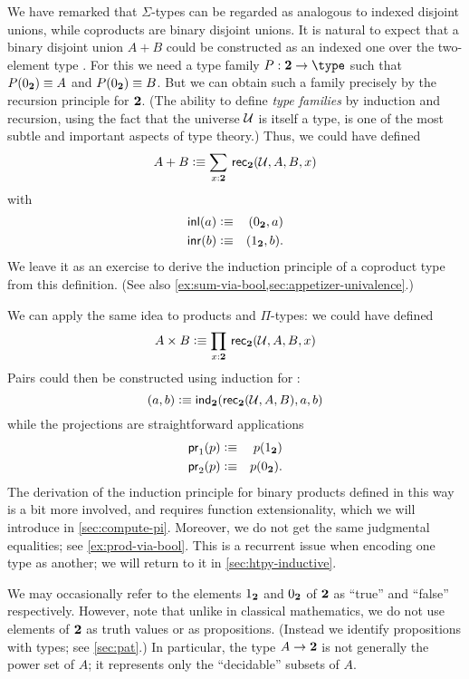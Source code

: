 We have remarked that $\Sigma$-types can be regarded as analogous to indexed disjoint unions, while coproducts are binary disjoint unions.
It is natural to expect that a binary disjoint union $A+B$ could be constructed as an indexed one over the two-element type \bool.
For this we need a type family $P:\bool\to\type$ such that $P({0_{\mathbf{2}}})\equiv A$ and $P({0_{\mathbf{2}}})\equiv B$.
But we can obtain such a family precisely by the recursion principle for $\mathbf{2}$.
(The ability to define \emph{type families} by induction and recursion, using the fact that the universe $\mathcal{U}$ is itself a type, is one of the most subtle and important aspects of type theory.)
Thus, we could have defined
\[ A + B \defeq \sm{x:\bool} \rec{\bool}(\UU,A,B,x) \]
with
\begin{eqnarray*}
  {\mathsf{inl}}(a) & \vcentcolon\equiv & ({0_{\mathbf{2}}},a) \\
  {\mathsf{inr}}(b) & \vcentcolon\equiv & ({1_{\mathbf{2}}},b).
\end{eqnarray*}
We leave it as an exercise to derive the induction principle of a coproduct type from this definition.
(See also \autoref{ex:sum-via-bool,sec:appetizer-univalence}.)

We can apply the same idea to products and $\Pi$-types: we could have defined
\[ A \times B \defeq \prd{x:\bool}\rec{\bool}(\UU,A,B,x) \]
Pairs could then be constructed using induction for \bool:
\[ (a,b) \vcentcolon\equiv \mathsf{ind}_{\mathbf{2}}(\mathsf{rec}_{\mathbf{2}}(\mathcal{U},A,B),a,b) \]
while the projections are straightforward applications
\begin{eqnarray*}
  \mathsf{pr}_{1}(p) & \vcentcolon\equiv & p({1_{\mathbf{2}}}) \\
  \mathsf{pr}_{2}(p) & \vcentcolon\equiv & p({0_{\mathbf{2}}}).
\end{eqnarray*}
The derivation of the induction principle for binary products defined in this way is a bit more involved, and requires function extensionality, which we will introduce in \autoref{sec:compute-pi}.
Moreover, we do not get the same judgmental equalities; see \autoref{ex:prod-via-bool}.
This is a recurrent issue when encoding one type as another; we will return to it in \autoref{sec:htpy-inductive}. 

We may occasionally refer to the elements ${1_{\mathbf{2}}}$ and ${0_{\mathbf{2}}}$ of $\mathbf{2}$ as ``true'' and ``false'' respectively.
However, note that unlike in classical mathematics, we do not use elements of $\mathbf{2}$ as truth values or as propositions.
(Instead we identify propositions with types; see \autoref{sec:pat}.)
In particular, the type $A \to \mathbf{2}$ is not generally the power set of $A$; it represents only the ``decidable'' subsets of $A$.


